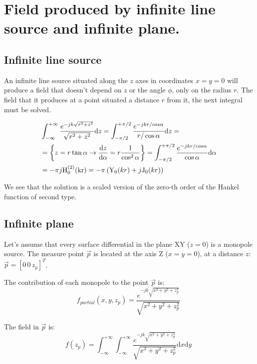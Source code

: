 \chapter{Field produced by infinite line source and infinite plane.}

\section{Infinite line source}

An infinite line source situated along the $z$ axes in coordinates $x = y = 0$ will produce a field that doesn't depend on $z$ or the angle $\phi$, only on the radius $r$. The field that it produces at a point situated a distance $r$ from it, the next integral must be solved.

\begin{equation}
\begin{aligned}
&\int_{-\infty}^{+\infty} \frac{e^{-j k \sqrt{r^2 + z^2}}}{\sqrt{r^2 + z^2}} \mathrm{d}z = 
\int_{-\pi/2}^{+\pi/2} \frac{e^{-j k r/cos{\alpha}}}{r/\cos{\alpha}} \mathrm{d}z = \\
&= \left\{ z = r \tan{\alpha} \rightarrow \dv{z}{\alpha} = r\frac{1}{\cos^2{\alpha}} \right\} = \int_{-\pi/2}^{+\pi/2} \frac{e^{-j k r/cos{\alpha}}}{\cos{\alpha}} \mathrm{d}\alpha \\
&= -\pi j \mathrm{H_0^{(2)}(k r)} = -\pi \left( \mathrm{Y}_0(k r) + j\mathrm{J}_0(k r)\right)
\end{aligned}
\end{equation}

We see that the solution is a scaled version of the zero-th order of the Hankel function of second type.

\section{Infinite plane}
Let's assume that every surface differential in the plane XY ($z = 0$) is a monopole source. The measure point $\vec{p}$ is located at the axis Z ($x = y = 0$), at a distance $z$: $\vec{p} = [0\, 0\, z_p]^T$.

The contribution of each monopole to the point $\vec{p}$ is:
\begin{equation}
f_{partial}(x, y, z_p) = \frac{e^{-j k \sqrt{x^2 + y^2 + z_p^2}}}{\sqrt{x^2 + y^2 + z_p^2}}
\end{equation}

The field in $\vec{p}$ is:
\begin{equation}
f(z_p) = \int_{-\infty}^{+\infty} \int_{-\infty}^{+\infty} \frac{e^{-j k \sqrt{x^2 + y^2 + z_p^2}}}{\sqrt{x^2 + y^2 + z_p^2}} \mathrm{d}x \mathrm{d}y
\end{equation}

